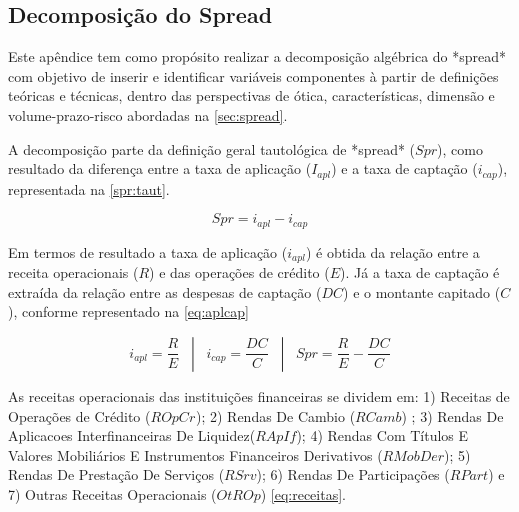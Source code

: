 \documentclass[
  12pt,
  12pt,
  openright,
  oneside,
  a4paper,
  chapter=TITLE,
  section=TITLE,
  subsection=TITLE,
  subsubsection=TITLE,
  english,
  portugues,
  sumario=tradicional]{abntex2}
\begin{document}
\begin{apendicesenv}

\vspace{-10mm}

\renewcommand{\thechapter}{\arabic{chapter}}

\chapter{Decomposição do Spread}\label{apendicea}

Este apêndice tem como propósito realizar a decomposição algébrica do *spread* com objetivo de inserir e identificar variáveis componentes à partir de definições teóricas e técnicas, dentro das perspectivas de ótica, características, dimensão e volume-prazo-risco abordadas na \autoref{sec:spread}.

A decomposição parte da definição geral tautológica de *spread* ($Spr$), como resultado da diferença entre a taxa de aplicação ($I_{apl}$) e a taxa de captação ($i_{cap}$), representada na \autoref{spr:taut}.



\begin{equation}\label{spr:taut}
Spr = i_{apl} - i_{cap}
\end{equation}



Em termos de resultado a taxa de aplicação ($i_{apl}$) é obtida da relação entre a receita operacionais ($R$) e das operações de crédito ($E$). Já a taxa de captação é extraída da relação entre as despesas de captação ($DC$) e o montante capitado ($C$), conforme representado na \autoref{eq:aplcap}


\begin{equation}\label{eq:aplcap}
i_{apl} = \frac{R}{E}  \hspace{10pt} |  \hspace{10pt} i_{cap} =  \frac{DC}{C}  \hspace{10pt} |  \hspace{10pt} Spr =  \frac{R_{}}{E} -  \frac{DC}{C}
\end{equation}


As receitas operacionais das instituições financeiras se dividem em: 1) Receitas de Operações de Crédito ($ROpCr_{}$); 2) Rendas De Cambio ($RCamb$) ; 3) Rendas De Aplicacoes Interfinanceiras De Liquidez($RApIf$); 4) Rendas Com Títulos E Valores Mobiliários E Instrumentos Financeiros Derivativos ($RMobDer$); 5) Rendas De Prestação De Serviços ($RSrv$); 6) Rendas De Participações ($RPart$) e 7) Outras Receitas Operacionais ($OtROp$) \autoref{eq:receitas}.



\end{apendicesenv}
\end{document}
